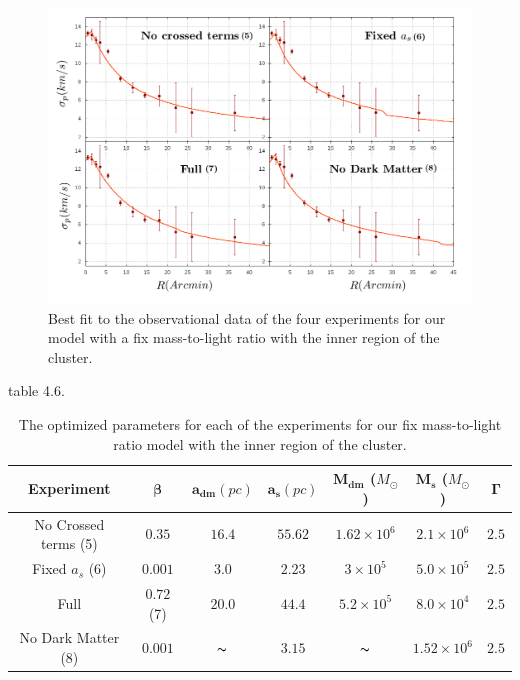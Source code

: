 \begin{figure}[H]
\centering
\includegraphics[width=15cm]{images/fix_gamma_refinado_12.png}
\caption[Best fit of our model with a fix mass-to-light ratio with the inner region]{Best fit to the observational data of the four experiments for our model with a fix mass-to-light ratio with the inner region of the cluster.}
\end{figure}

table 4.6.

\begin{table}[H]
\begin{center}
\begin{tabular}{| c| c| c| c| c| c| c|}
    \hline
    \textbf{Experiment} & $\mathbf{\beta}$ & $\mathbf{a_{dm}} (pc)$ & $\mathbf{a_{s}} (pc)$ & $\mathbf{M_{dm}}$ ($M_{\odot}$) & $\mathbf{M_{s}}$ ($M_{\odot}$) & $\mathbf{\Gamma}$\\ \hline
	No Crossed terms (5) & $0.35$ &	$16.4$ &	$55.62$ &	$1.62 \times 10^{6}$ &	$2.1 \times 10^{6}$ &	$2.5$\\ \hline
	Fixed $a_s$ (6) &	$0.001$ &	$3.0$ &	$2.23$ &	$3 \times 10^{5}$ &	$5.0 \times 10 ^{5}$ &	$2.5$\\ \hline
	Full &	$0.72$ (7) &	$20.0$ &	$44.4$ &	$5.2 \times 10^{5}$ &	$8.0 \times 10^{4}$ &	$2.5$\\ \hline
	No Dark Matter (8) &	$0.001$ &	$\thicksim$ & $ 3.15$ &	$\thicksim$ & $ 1.52 \times 10^{6}$ & 	$2.5$\\
    \hline
  \end{tabular} 
\caption[Optimized parameters for our fix mass-to-light ratio model with the inner region.]{The optimized parameters for each of the experiments for our fix mass-to-light ratio model with the inner region of the cluster.}
\end{center}
\end{table}

